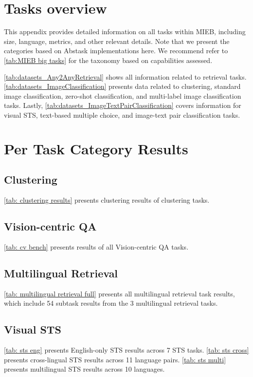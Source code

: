\appendix

\section{Tasks overview}
\label{sec:overview}
This appendix provides detailed information on all tasks within MIEB, including size, language, metrics, and other relevant details. Note that we present the categories based on Abstask implementations here. We recommend refer to \autoref{tab:MIEB big tasks} for the taxonomy based on capabilities assessed.

\autoref{tab:datasets_Any2AnyRetrieval} shows all information related to retrieval tasks. \autoref{tab:datasets_ImageClassification} presents data related to clustering, standard image classification, zero-shot classification, and multi-label image classification tasks. Lastly, \autoref{tab:datasets_ImageTextPairClassification} covers information for visual STS, text-based multiple choice, and image-text pair classification tasks.





\section{Per Task Category Results}
\label{sec: task tpye results}

\subsection{Clustering}

\autoref{tab: clustering results} presents clustering results of clustering tasks.

\subsection{Vision-centric QA}

\autoref{tab: cv bench} presents results of all Vision-centric QA tasks.

\subsection{Multilingual Retrieval}
\autoref{tab: multilingual retrieval full} presents all multilingual retrieval task results, which include 54 subtask results from the 3 multilingual retrieval tasks.

\subsection{Visual STS}
\autoref{tab: sts eng} presents English-only STS results across 7 STS tasks. \autoref{tab: sts cross} presents cross-lingual STS results across 11 language pairs. \autoref{tab: sts multi} presents multilingual STS results across 10 languages.

